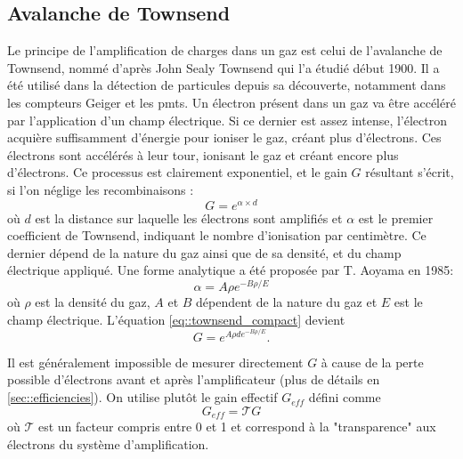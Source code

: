     \subsection{Avalanche de Townsend}\label{sec::townsend}
      
      Le principe de l'amplification de charges dans un gaz est celui de l'avalanche de Townsend, nommé d'après John Sealy Townsend qui l'a étudié début 1900\cite{Townsend1910}. Il a été utilisé dans la détection de particules depuis sa découverte, notamment dans les compteurs Geiger et les \glspl{pmt}. Un électron présent dans un gaz va être accéléré par l'application d'un champ électrique. Si ce dernier est assez intense, l'électron acquière suffisamment d'énergie pour ioniser le gaz, créant plus d'électrons. Ces électrons sont accélérés à leur tour, ionisant le gaz et créant encore plus d'électrons. Ce processus est clairement exponentiel, et le gain $G$ résultant s'écrit, si l'on néglige les recombinaisons :
      \begin{equation}\label{eq::townsend_compact}
        G = e^{\alpha\times d}
      \end{equation}
      où $d$ est la distance sur laquelle les électrons sont amplifiés et $\alpha$ est le premier coefficient de Townsend, indiquant le nombre d'ionisation par centimètre. Ce dernier dépend de la nature du gaz ainsi que de sa densité, et du champ électrique appliqué. Une forme analytique a été proposée par T. Aoyama en 1985\cite{Aoyama1985}:
      \begin{equation}\label{eq::townsend_coef}
        \alpha = A\rho e^{-B\rho/E}
      \end{equation}
      où $\rho$ est la densité du gaz, $A$ et $B$ dépendent de la nature du gaz et $E$ est le champ électrique. L'équation \eqref{eq::townsend_compact} devient
      \begin{equation}\label{eq::townsend}
        G = e^{A\rho  de^{-B\rho /E}}.
      \end{equation}

      Il est généralement impossible de mesurer directement $G$ à cause de la perte possible d'électrons avant et après l'amplificateur (plus de détails en \autoref{sec::efficiencies}). On utilise plutôt le gain effectif $G_{eff}$ défini comme
      \begin{equation}\label{eq::gain_eff}
        G _{eff}= \mathcal{T}G
      \end{equation}
      où $\mathcal{T}$ est un facteur compris entre 0 et 1 et correspond à la "transparence" aux électrons du système d'amplification. 

